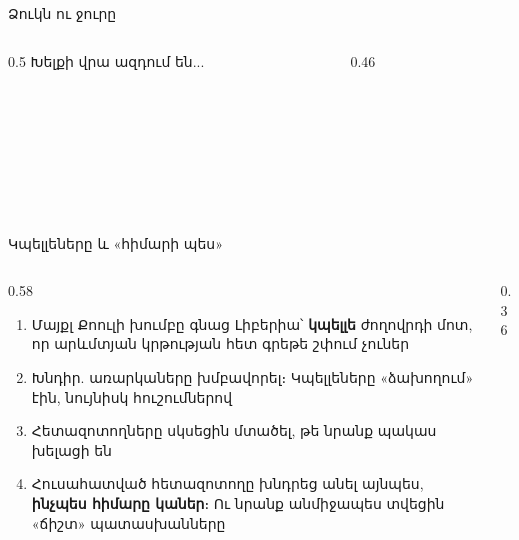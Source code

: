 \begin{frame}{Ձուկն ու ջուրը}
  \begin{columns}[c]
    \begin{column}{0.5\textwidth}
      Խելքի վրա ազդում են...\par\medskip
      \ \par\smallskip
      \ \par\smallskip
      \ \par\smallskip
      \ 
    \end{column}
    \begin{column}{0.46\textwidth}
      \centering
      \ \par\medskip
    \end{column}
  \end{columns}
\end{frame}

\begin{frame}{Կպելլեները և «հիմարի պես»}
  \begin{columns}[c]
    \begin{column}{0.58\textwidth}
      \begin{enumerate}
        \item<1-> Մայքլ Քոուլի խումբը գնաց Լիբերիա՝ \textbf{կպելլե} ժողովրդի մոտ, որ արևմտյան կրթության հետ գրեթե շփում չուներ
        \item<2-> Խնդիր. առարկաները խմբավորել։ Կպելլեները «ձախողում» էին, նույնիսկ հուշումներով
        \item<3-> Հետազոտողները սկսեցին մտածել, թե նրանք պակաս խելացի են
        \item<4-> Հուսահատված հետազոտողը խնդրեց անել այնպես, \textbf{ինչպես հիմարը կաներ}։ Ու նրանք անմիջապես տվեցին «ճիշտ» պատասխանները
      \end{enumerate}
    \end{column}
    \begin{column}{0.36\textwidth}
      \centering
      \par\medskip
    \end{column}
  \end{columns}
\end{frame}

